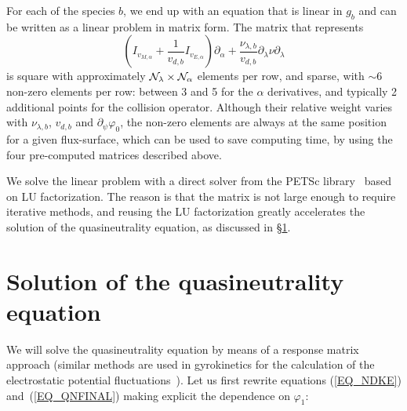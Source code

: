 For each of the species $b$, we end up with an equation that is linear in $g_b$ and can be written as a linear problem in matrix form. The matrix that represents
\begin{equation}
\left(I_{v_{M,\alpha}}+\frac{1}{v_{d,b}}I_{v_{E,\alpha}}\right)\partial_\alpha +\frac{\nu_{\lambda,b}}{v_{d,b}} \partial_\lambda \nu\partial_\lambda 
\end{equation}
is square with approximately ${\cal{N}}_\lambda\times {\cal{N}}_\alpha$ elements per row, and sparse, with $\sim 6$ non-zero elements per row: between 3 and 5 for the $\alpha$ derivatives, and typically 2 additional points for the collision operator. Although their relative weight varies with $\nu_{\lambda,b}$, $v_{d,b}$ and $\partial_\psi\varphi_0$, the non-zero elements are always at the same position for a given flux-surface, which can be used to save computing time, by using the four pre-computed matrices described above.

We solve the linear problem with a direct solver from the {\ttfamily PETSc} library~\citep{petsc-efficient,petsc-web-page,petsc-user-ref} based on LU factorization. The reason is that the matrix is not large enough to require iterative methods, and reusing the LU factorization greatly accelerates the solution of the quasineutrality equation, as discussed in \S\ref{SEC_SOLQN}.


\section{Solution of the quasineutrality equation}\label{SEC_SOLQN}


We will solve the quasineutrality equation by means of a response matrix approach (similar methods are used in gyrokinetics for the calculation of the electrostatic potential fluctuations~\citep{kotschenreuther1995response}). Let us first rewrite equations (\ref{EQ_NDKE}) and~(\ref{EQ_QNFINAL}) making explicit the dependence on $\varphi_1$:

